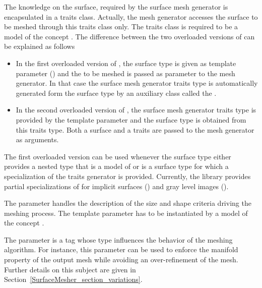 The knowledge on the surface, required by the surface mesh generator
is  encapsulated in a
traits class. Actually, the mesh generator accesses the surface to be meshed
through this traits class only.
The traits class is required to be a model
of the concept .
The difference between the two overloaded versions of
can be explained as follows
\begin{itemize}
\item
In the first  overloaded version
of ,  the surface type  is given
as template parameter  () and the 
to be meshed is passed as parameter to the mesh generator.
In that case the surface mesh generator traits type
is  automatically generated form the surface type
by an auxiliary class called  the .
\item In the second overloaded version of ,
the surface mesh generator traits type is provided
by the  template parameter 
and the surface type is obtained from this traits type.
Both  a surface and a traits
are passed to the mesh generator as arguments.
\end{itemize}


The first overloaded version can be used
whenever the surface type either provides  a nested type
that is  a model of 
or is a surface type for which a specialization
of the traits generator 
is provided.
Currently, the library provides partial specializations
of  
for implicit surfaces () and
gray level images ().



The parameter  handles the description of the size and shape
criteria driving the meshing process. The template parameter 
has to be instantiated by a model of the concept .


The parameter   is a tag
whose type influences the behavior of the
meshing algorithm. For instance, this parameter
can be used to enforce the manifold property
of the output mesh while avoiding
an over-refinement of the mesh. Further details on this
subject are given in
Section~\ref{SurfaceMesher_section_variations}.

